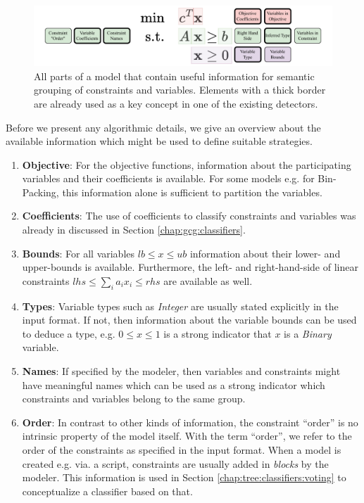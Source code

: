 		\begin{figure}[ht!]
			\centering
			\includegraphics[scale=0.8]{Bilder/DrawIO/model_information}
			\caption{All parts of a model that contain useful information for semantic grouping of constraints and variables. Elements with a thick border are already used as a key concept in one of the existing detectors.}
			\label{fig:tree:information}
		\end{figure}
		
		Before we present any algorithmic details, we give an overview about the available information which might be used to define suitable strategies. 
		
		\begin{enumerate}
			\item \textbf{Objective}: For the objective functions, information about the participating variables and their coefficients is available. For some models e.g. for Bin-Packing, this information alone is sufficient to partition the variables.
			\item \textbf{Coefficients}:
			The use of coefficients to classify constraints and variables was already in discussed in Section \ref{chap:gcg:classifiers}.
			\item \textbf{Bounds}: For all variables $lb \leq x \leq ub$ information about their lower- and upper-bounds is available.
			Furthermore, the left- and right-hand-side of linear constraints $lhs \leq \sum_i a_i x_i \leq rhs$ are available as well.
			\item \textbf{Types}: Variable types such as \textit{Integer} are usually stated explicitly in the input format. If not, then information about the variable bounds can be used to deduce a type, e.g. $0 \leq x \leq 1$ is a strong indicator that $x$ is a \textit{Binary} variable.
			\item \textbf{Names}: If specified by the modeler, then variables and constraints might have meaningful names which can be used as a strong indicator which constraints and variables belong to the same group.
			\item \textbf{Order}: In contrast to other kinds of information, the constraint \enquote{order} is no intrinsic property of the model itself. With the term \enquote{order}, we refer to the order of the constraints as specified in the input format. When a model is created e.g. via. a script, constraints are usually added in \textit{blocks} by the modeler. This information is used in Section \ref{chap:tree:classifiers:voting} to conceptualize a classifier based on that.
		\end{enumerate}
	

